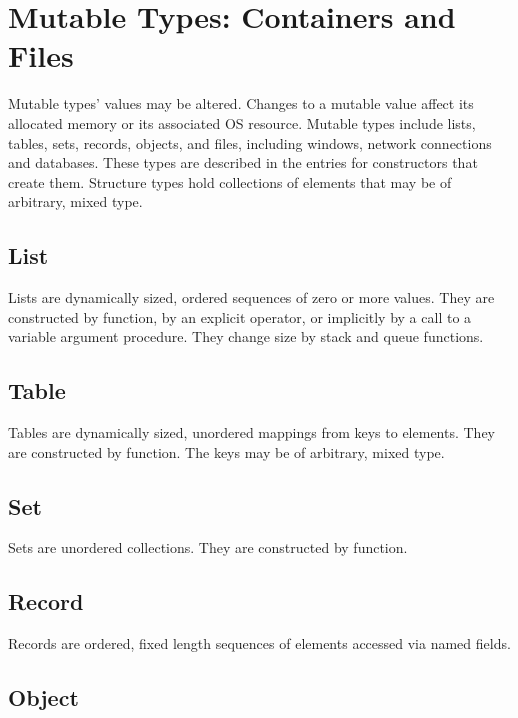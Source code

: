 \section{Mutable Types: Containers and Files}

Mutable types' values may be altered. Changes to a
mutable value affect its allocated memory or its
associated OS resource. Mutable types include lists, tables,
sets, records, objects, and files, including windows, network
connections and databases. These types are described in
the entries for constructors that
create them. Structure types hold
collections of elements that may be of arbitrary, mixed type.

\subsection*{List}

Lists are dynamically sized, ordered sequences of zero or
more values. They are constructed by function, by an explicit
operator, or implicitly by a call to a variable argument procedure.
They change size by stack and queue functions.

\subsection*{Table}

Tables are dynamically sized, unordered mappings from keys
to elements. They are constructed by function. The keys may be of
arbitrary, mixed type.

\subsection*{Set}

Sets are unordered collections. They are constructed by function.

\subsection*{Record}

Records are ordered, fixed length sequences of elements
accessed via named fields.

\subsection*{Object}

